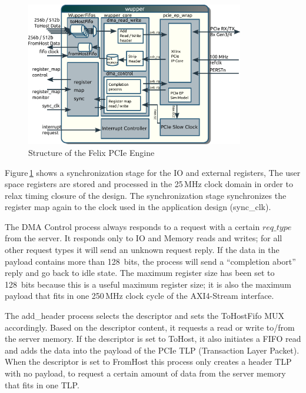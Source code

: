 \begin{figure}[H]
	\centering
	\includegraphics[trim=0mm 0cm 0mm 1cm,width=0.85\textwidth, page=1]{figures/wupper_structure.pdf}
	\caption{Structure of the Felix PCIe Engine}
	\label{fig:pcie_core_structure}
\end{figure}

Figure\,\ref{fig:pcie_core_structure} shows a synchronization stage for the IO and external registers, The user space registers are stored and processed in the 25\,MHz clock domain in order to relax timing closure of the design. The synchronization stage synchronizes the register map again to the clock used in the application design (sync\_clk).


The DMA Control process  always responds to a request with a certain $req\_type$ from the server. It responds only to IO and Memory reads and writes; for all other request types it will send an unknown request reply. If the data in the payload contains more than 128~bits, the process will send a ``completion abort'' reply and go back to idle state. The maximum register size has been set to 128~bits because this is a useful maximum register size; it is also the maximum payload that fits in one 250\,MHz clock cycle of the AXI4-Stream interface.



The add\_header process selects the descriptor and sets the ToHostFifo MUX accordingly. Based on the descriptor content, it requests a read or write to/from the server memory. If the descriptor is set to ToHost, it also initiates a FIFO read and adds the data into the payload of the PCIe TLP (Transaction Layer Packet). When the descriptor is set to FromHost this process only creates a header TLP with no payload, to request a certain amount of data from the server memory that fits in one TLP.

